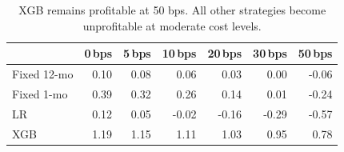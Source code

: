 \begin{table}[H]
\centering
\small
\begin{tabular}{l r r r r r r}
\toprule
 & 0\,bps & 5\,bps & 10\,bps & 20\,bps & 30\,bps & 50\,bps \\
\midrule
Fixed 12-mo    & 0.10 & 0.08 & 0.06 & 0.03 & 0.00 & -0.06 \\
Fixed 1-mo     & 0.39 & 0.32 & 0.26 & 0.14 & 0.01 & -0.24 \\
LR         & 0.12 & 0.05 & -0.02 & -0.16 & -0.29 & -0.57 \\
XGB        & 1.19 & 1.15 & 1.11 & 1.03 & 0.95 & 0.78 \\
\bottomrule
\end{tabular}
\caption{XGB remains profitable at 50 bps. All other strategies become unprofitable at moderate cost levels.}
\label{tab:cost_sensitivity}
\end{table}